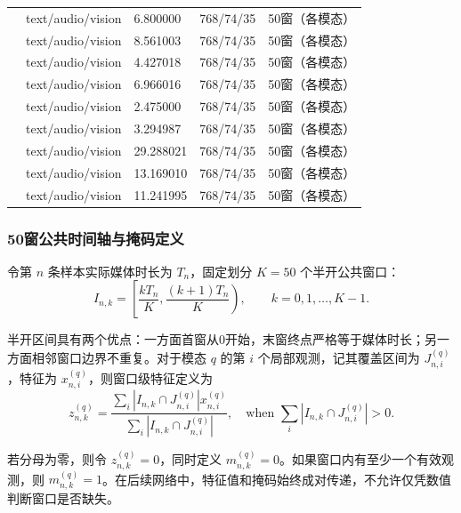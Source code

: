 \documentclass{gmcmthesis}
\begin{document}
\begin{longtable}{C{0.27\textwidth}C{0.16\textwidth}C{0.14\textwidth}C{0.14\textwidth}C{0.14\textwidth}}
\texttt{} & text/audio/vision & 6.800000 & 768/74/35 & 50窗（各模态） \\
\texttt{} & text/audio/vision & 8.561003 & 768/74/35 & 50窗（各模态） \\
\texttt{} & text/audio/vision & 4.427018 & 768/74/35 & 50窗（各模态） \\
\texttt{} & text/audio/vision & 6.966016 & 768/74/35 & 50窗（各模态） \\
\texttt{} & text/audio/vision & 2.475000 & 768/74/35 & 50窗（各模态） \\
\texttt{} & text/audio/vision & 3.294987 & 768/74/35 & 50窗（各模态） \\
\texttt{} & text/audio/vision & 29.288021 & 768/74/35 & 50窗（各模态） \\
\texttt{} & text/audio/vision & 13.169010 & 768/74/35 & 50窗（各模态） \\
\texttt{} & text/audio/vision & 11.241995 & 768/74/35 & 50窗（各模态） \\
\bottomrule
\end{longtable}
\endgroup

\subsubsection{50窗公共时间轴与掩码定义}
令第 $n$ 条样本实际媒体时长为 $T_n$，固定划分 $K=50$ 个半开公共窗口：
\begin{equation}
I_{n,k}=\left[\frac{kT_n}{K},\frac{(k+1)T_n}{K}\right),\qquad k=0,1,\ldots,K-1.
\label{eq:window}
\end{equation}
\par\indent 半开区间具有两个优点：一方面首窗从0开始，末窗终点严格等于媒体时长；另一方面相邻窗口边界不重复。对于模态 $q$ 的第 $i$ 个局部观测，记其覆盖区间为 $J_{n,i}^{(q)}$，特征为 $x_{n,i}^{(q)}$，则窗口级特征定义为
\begin{equation}
z_{n,k}^{(q)}=\frac{\sum_i |I_{n,k}\cap J_{n,i}^{(q)}|x_{n,i}^{(q)}}{\sum_i |I_{n,k}\cap J_{n,i}^{(q)}|},\quad \text{when }\sum_i |I_{n,k}\cap J_{n,i}^{(q)}|>0.
\label{eq:weighted_pool}
\end{equation}
\par\indent 若分母为零，则令 $z_{n,k}^{(q)}=0$，同时定义 $m_{n,k}^{(q)}=0$。如果窗口内有至少一个有效观测，则 $m_{n,k}^{(q)}=1$。在后续网络中，特征值和掩码始终成对传递，不允许仅凭数值判断窗口是否缺失。
\end{document}
